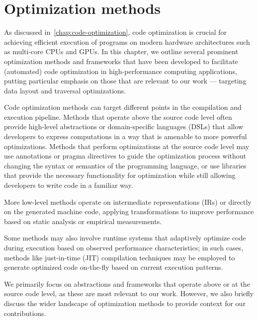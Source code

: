 \chapter{Optimization methods}\label{chap:optimization-methods}

As discussed in~\cref{chap:code-optimization}, code optimization is crucial for achieving efficient execution of programs on modern hardware architectures such as multi-core CPUs and GPUs. In this chapter, we outline several prominent optimization methods and frameworks that have been developed to facilitate (automated) code optimization in high-performance computing applications, putting particular emphasis on those that are relevant to our work --- targeting data layout and traversal optimizations.

Code optimization methods can target different points in the compilation and execution pipeline.
Methods that operate above the source code level often provide high-level abstractions or domain-specific languages (DSLs) that allow developers to express computations in a way that is amenable to more powerful optimizations. Methods that perform optimizations at the source code level may use annotations or pragma directives to guide the optimization process without changing the syntax or semantics of the programming language, or use libraries that provide the necessary functionality for optimization while still allowing developers to write code in a familiar way.

More low-level methods operate on intermediate representations (IRs) or directly on the generated machine code, applying transformations to improve performance based on static analysis or empirical measurements.

Some methods may also involve runtime systems that adaptively optimize code during execution based on observed performance characteristics; in such cases, methods like just-in-time (JIT) compilation techniques may be employed to generate optimized code on-the-fly based on current execution patterns.

We primarily focus on abstractions and frameworks that operate above or at the source code level, as these are most relevant to our work. However, we also briefly discuss the wider landscape of optimization methods to provide context for our contributions.


